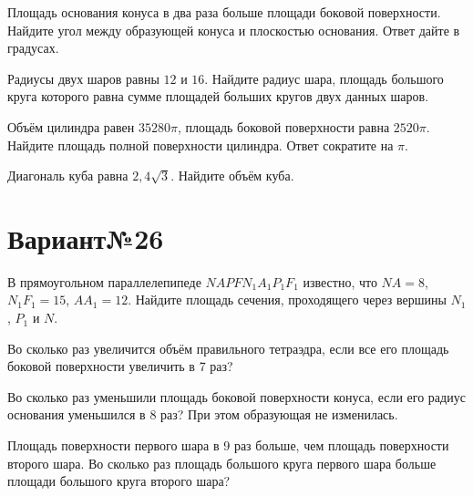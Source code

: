 \documentclass[4apaper]{article}
\begin{document}
\begin{taskBN}{3}
Площадь основания конуса в два раза больше площади боковой поверхности. Найдите угол между образующей конуса и плоскостью основания. Ответ дайте в градусах.
\end{taskBN}

\begin{taskBN}{4}
Радиусы двух шаров равны $12$ и $16$. Найдите радиус шара, площадь большого круга которого равна сумме площадей больших кругов двух данных шаров.
\end{taskBN}

\begin{taskBN}{5}
Объём цилиндра равен $35280\pi$, площадь боковой поверхности равна $2520\pi$. Найдите площадь полной поверхности цилиндра. Ответ сократите на $\pi$.
\end{taskBN}

\begin{taskBN}{6}
Диагональ куба равна $2,4\sqrt{3}$. Найдите объём куба.
\end{taskBN}
\newpage\section*{Вариант№26}

\begin{taskBN}{1}
В прямоугольном параллелепипеде  $NAPFN_{1}A_{1}P_{1}F_{1}$  известно, что  $NA = 8$, $N_{1}F_{1} = 15$, $AA_{1} = 12$. Найдите площадь сечения, проходящего через вершины $N_{1}$, $P_{1}$ и $N$.
\end{taskBN}

\begin{taskBN}{2}
Во сколько раз увеличится объём правильного тетраэдра, если все его площадь боковой поверхности увеличить в 7 раз?
\end{taskBN}

\begin{taskBN}{3}
Во сколько раз уменьшили площадь боковой поверхности конуса, если его радиус основания уменьшился в 8 раз? При этом образующая не изменилась.
\end{taskBN}

\begin{taskBN}{4}
Площадь поверхности первого шара в 9 раз больше, чем площадь поверхности второго шара. Во сколько раз площадь большого круга первого шара больше площади большого круга второго шара?
\end{taskBN}
\end{document}
